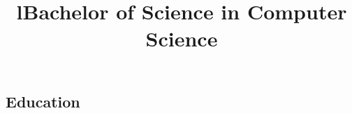\documentclass[12pt, line]{res}
\let\tempone\itemize
\let\temptwo\enditemize
\renewenvironment{itemize}{%
  \setlength{\topsep}{0pt}%
  \setlength{\partopsep}{0pt}%
  \tempone
  \renewcommand{\labelitemi}{$\bullet$}%
  \vspace{-0.25in}%
  \setlength{\itemsep}{3pt}%
  \setlength{\parsep}{0pt}%
}{%
  \temptwo
}
\begin{document}
\begin{resume}
  \section{Education}
  \begin{format}
    \\
    \title{l}\\
    \body\\
  \end{format}

  \title{Bachelor of Science in Computer Science}
  \begin{position}
  \end{position}


\end{resume}
\end{document}
